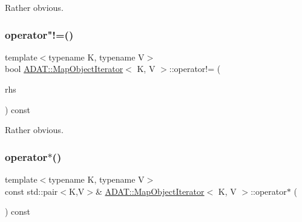 Rather obvious. 

\mbox{\label{classADAT_1_1MapObjectIterator_a1110663c46b0e652d8ecd0dbe80bd255}} 
\subsubsection{\texorpdfstring{operator"!=()}{operator!=()}\hspace{0.1cm}{\footnotesize\ttfamily [2/2]}}
{\footnotesize\ttfamily template$<$typename K, typename V$>$ \\
bool \mbox{\hyperlink{classADAT_1_1MapObjectIterator}{A\+D\+A\+T\+::\+Map\+Object\+Iterator}}$<$ K, V $>$\+::operator!= (\begin{DoxyParamCaption}\item[{const \mbox{\hyperlink{classADAT_1_1MapObjectIterator}{Map\+Object\+Iterator}}$<$ K, V $>$ \&}]{rhs }\end{DoxyParamCaption}) const\hspace{0.3cm}{\ttfamily [inline]}}



Rather obvious. 

\mbox{\label{classADAT_1_1MapObjectIterator_a3faecdcae68181e91e40dad404296ed7}} 
\subsubsection{\texorpdfstring{operator$\ast$()}{operator*()}\hspace{0.1cm}{\footnotesize\ttfamily [1/2]}}
{\footnotesize\ttfamily template$<$typename K, typename V$>$ \\
const std\+::pair$<$K,V$>$\& \mbox{\hyperlink{classADAT_1_1MapObjectIterator}{A\+D\+A\+T\+::\+Map\+Object\+Iterator}}$<$ K, V $>$\+::operator$\ast$ (\begin{DoxyParamCaption}{ }\end{DoxyParamCaption}) const\hspace{0.3cm}{\ttfamily [inline]}}

